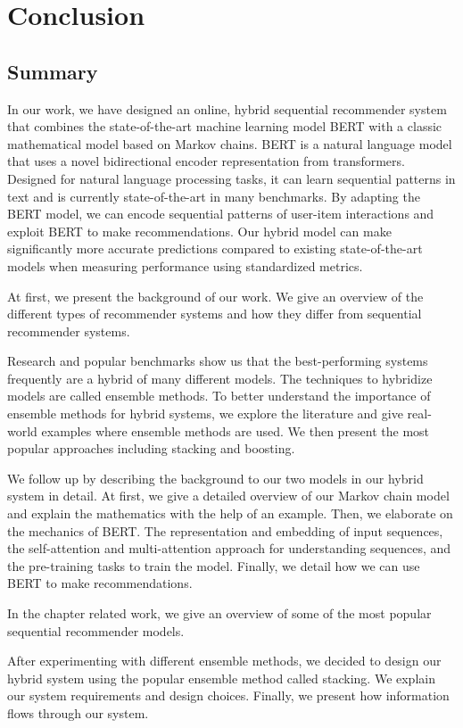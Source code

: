 \chapter{Conclusion}
\section{Summary}
In our work, we have designed an online, hybrid sequential recommender system that combines the state-of-the-art machine learning model BERT with a classic mathematical model based on Markov chains. BERT is a natural language model that uses a novel bidirectional encoder representation from transformers. Designed for natural language processing tasks, it can learn sequential patterns in text and is currently state-of-the-art in many benchmarks. By adapting the BERT model, we can encode sequential patterns of user-item interactions and exploit BERT to make recommendations. Our hybrid model can make significantly more accurate predictions compared to existing state-of-the-art models when measuring performance using standardized metrics.

At first, we present the background of our work. We give an overview of the different types of recommender systems and how they differ from sequential recommender systems.

Research and popular benchmarks show us that the best-performing systems frequently are a hybrid of many different models. The techniques to hybridize models are called ensemble methods. To better understand the importance of ensemble methods for hybrid systems, we explore the literature and give real-world examples where ensemble methods are used. We then present the most popular approaches including stacking and boosting.

We follow up by describing the background to our two models in our hybrid system in detail. At first, we give a detailed overview of our Markov chain model and explain the mathematics with the help of an example. Then, we elaborate on the mechanics of BERT. The representation and embedding of input sequences, the self-attention and multi-attention approach for understanding sequences, and the pre-training tasks to train the model. Finally, we detail how we can use BERT to make recommendations. 

In the chapter related work, we give an overview of some of the most popular sequential recommender models.

After experimenting with different ensemble methods, we decided to design our hybrid system using the popular ensemble method called stacking. We explain our system requirements and design choices. Finally, we present how information flows through our system. 

